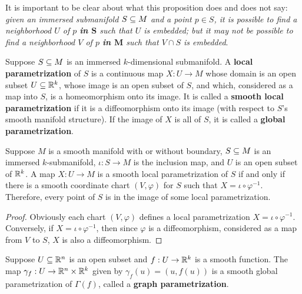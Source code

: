 It is important to be clear about what this proposition does and does not say: \textit{given an immersed submanifold $S\subseteq M$ and a point $p\in S$, it is possible to find a neighborhood $U$ of $p$ \textbf{in $\bm{S}$} such that $U$ is embedded; but it may not be possible to find a neighborhood $V$ of $p$ \textbf{in $\bm{M}$} such that $V\cap S$ is embedded}.\par
Suppose $S\subseteq M$ is an immersed $k$-dimensional submanifold. A \textbf{local parametrization} of $S$ is a continuous map $X:U\to M$ whose domain is an open subset $U\subseteq\mathbb{R}^k$, whose image is an open subset of $S$, and which, considered as a map into $S$, is a homeomorphism onto its image. It is called a \textbf{smooth local parametrization} if it is a diffeomorphism onto its image (with respect to $S$'s smooth manifold structure). If the image of $X$ is all of $S$, it is called a \textbf{global parametrization}.
\begin{proposition}
Suppose $M$ is a smooth manifold with or without boundary, $S\subseteq M$ is an immersed $k$-submanifold, $\iota:S\to M$ is the inclusion map, and $U$ is an open subset of $\mathbb{R}^k$. A map $X:U\to M$ is a smooth local parametrization of $S$ if and only if there is a smooth coordinate chart $(V,\varphi)$ for $S$ such that $X=\iota\circ\varphi^{-1}$. Therefore, every point of $S$ is in the image of some local parametrization.
\end{proposition}
\begin{proof}
Obviously each chart $(V,\varphi)$ defines a local parametrization $X=\iota\circ\varphi^{-1}$. Conversely, if $X=\iota\circ\varphi^{-1}$, then since $\varphi$ is a diffeomorphism, considered as a map from $V$ to $S$, $X$ is also a diffeomorphism.
\end{proof}
\begin{example}
Suppose $U\subseteq\mathbb{R}^n$ is an open subset and $f:U\to\mathbb{R}^k$ is a smooth function. The map $\gamma_f:U\to\mathbb{R}^n\times\mathbb{R}^k$ given by $\gamma_f(u)=(u,f(u))$ is a smooth global parametrization of $\Gamma(f)$, called a \textbf{graph parametrization}.
\end{example}
